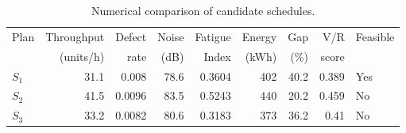 \begin{table}[htbp]
\centering
\caption{Numerical comparison of candidate schedules.}
\label{tab:numerical-sim}
\small
\begin{tabular}{@{}lrrrrrrrl@{}}
\toprule
Plan & Throughput & Defect & Noise & Fatigue & Energy & Gap & V/R & Feasible \\
     & (units/h)  & rate   & (dB)  & Index   & (kWh)  & (\%) & score &         \\
\midrule
$S_{1}$ & 31.1 & 0.008 & 78.6 & 0.3604 & 402 & 40.2 & 0.389 & Yes \\
$S_{2}$ & 41.5 & 0.0096 & 83.5 & 0.5243 & 440 & 20.2 & 0.459 & No \\
$S_{3}$ & 33.2 & 0.0082 & 80.6 & 0.3183 & 373 & 36.2 & 0.41 & No \\
\bottomrule
\end{tabular}
\end{table}
